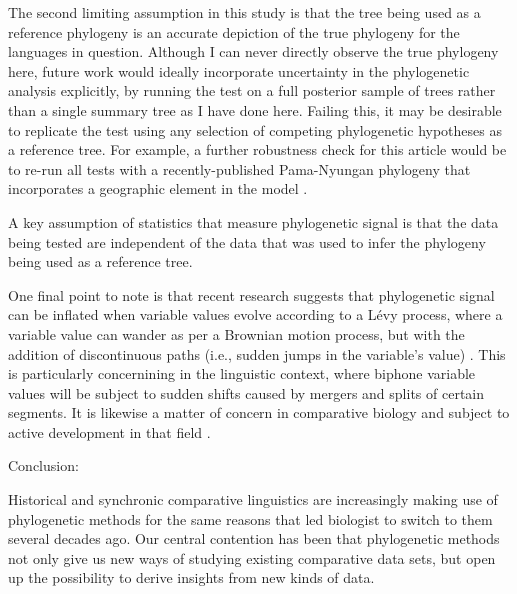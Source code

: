 The second limiting assumption in this study is that the tree being used as a reference phylogeny is an accurate depiction of the true phylogeny for the languages in question. Although I can never directly observe the true phylogeny here, future work would ideally incorporate uncertainty in the phylogenetic analysis explicitly, by running the test on a full posterior sample of trees rather than a single summary tree as I have done here. Failing this, it may be desirable to replicate the test using any selection of competing phylogenetic hypotheses as a reference tree. For example, a further robustness check for this article would be to re-run all tests with a recently-published Pama-Nyungan phylogeny that incorporates a geographic element in the model \autocite{bouckaert_origin_2018}.

A key assumption of statistics that measure phylogenetic signal is that the data being tested are independent of the data that was used to infer the phylogeny being used as a reference tree.

One final point to note is that recent research suggests that phylogenetic signal can be inflated when variable values evolve according to a Lévy process, where a variable value can wander as per a Brownian motion process, but with the addition of discontinuous paths (i.e., sudden jumps in the variable's value) \autocite{uyeda_rethinking_2018}. This is particularly concernining in the linguistic context, where biphone variable values will be subject to sudden shifts caused by mergers and splits of certain segments. It is likewise a matter of concern in comparative biology and subject to active development in that field \autocite{uyeda_rethinking_2018}.

Conclusion:

Historical and synchronic comparative linguistics are increasingly making use of phylogenetic methods for the same reasons that led biologist to switch to them several decades ago. Our central contention has been that phylogenetic methods not only give us new ways of studying existing comparative data sets, but open up the possibility to derive insights from new kinds of data.

